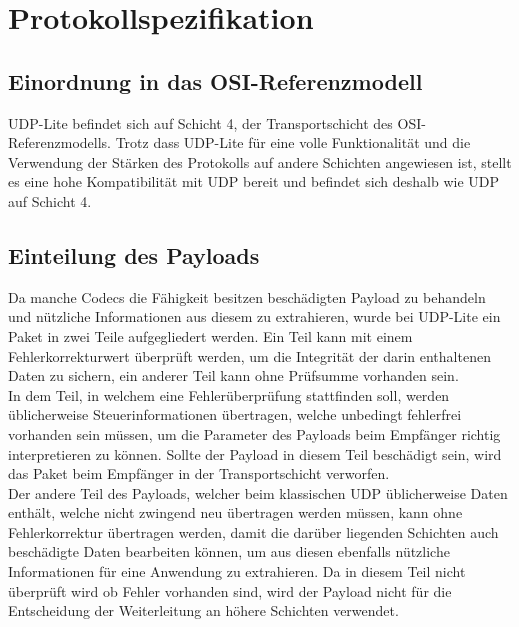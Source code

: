\documentclass{template}
\begin{document}



\section{Protokollspezifikation}

\subsection{Einordnung in das OSI-Referenzmodell}

UDP-Lite befindet sich auf Schicht 4, der Transportschicht des OSI-Referenzmodells.
Trotz dass UDP-Lite für eine volle Funktionalität und die Verwendung der
Stärken des Protokolls auf andere Schichten angewiesen ist, stellt es eine
hohe Kompatibilität mit UDP bereit und befindet sich deshalb wie UDP auf Schicht 4.

\subsection{Einteilung des Payloads}

Da manche Codecs die Fähigkeit besitzen 
beschädigten Payload zu behandeln und nützliche Informationen
aus diesem zu extrahieren, wurde bei UDP-Lite ein Paket in
zwei Teile aufgegliedert werden. Ein Teil kann mit einem Fehlerkorrekturwert
überprüft werden, um die Integrität der darin enthaltenen Daten zu sichern,
ein anderer Teil kann ohne Prüfsumme vorhanden sein.\\

In dem Teil, in welchem
eine Fehlerüberprüfung stattfinden soll, werden üblicherweise Steuerinformationen
übertragen, welche unbedingt fehlerfrei vorhanden sein müssen, 
um die Parameter des Payloads beim Empfänger richtig interpretieren zu können.
Sollte der Payload in diesem Teil beschädigt sein, wird das Paket beim Empfänger in der
Transportschicht verworfen.\\

Der andere Teil des Payloads, welcher beim klassischen UDP üblicherweise Daten enthält,
welche nicht zwingend neu übertragen werden müssen, kann ohne Fehlerkorrektur übertragen werden,
damit die darüber liegenden Schichten auch beschädigte Daten bearbeiten können,
um aus diesen ebenfalls nützliche Informationen für eine Anwendung zu extrahieren.
Da in diesem Teil nicht überprüft wird ob Fehler vorhanden sind,
wird der Payload nicht für die Entscheidung der Weiterleitung an höhere Schichten verwendet.\\
\end{document}
